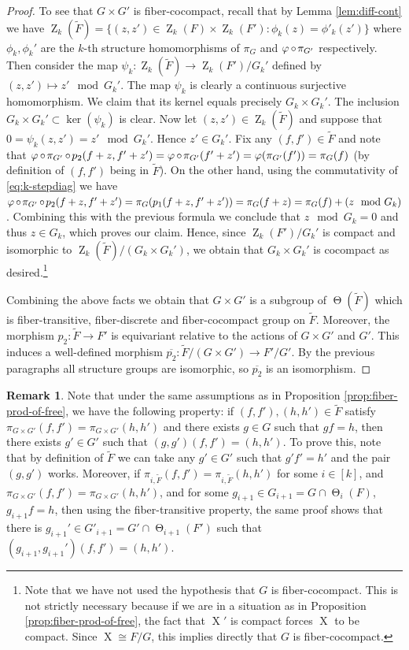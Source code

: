 \documentclass[a4paper,12pt,reqno]{amsart}
\theoremstyle{definition}
\newtheorem{remark}[theorem]{Remark}
\def\to{\rightarrow}
\DeclareMathOperator{\ab}{Z}
\DeclareMathOperator{\tran}{\Theta}
\DeclareMathOperator{\ns}{X}
\DeclareMathOperator{\co}{\circ\hspace{-0.02 cm}}
\begin{document}
\begin{proof}
To see that $G\times G'$ is fiber-cocompact, recall that by Lemma \ref{lem:diff-cont} we have $\ab_k(\tilde{F})=\{(z,z')\in \ab_k(F)\times \ab_k(F'):\phi_k(z)=\phi'_k(z')\}$ where $\phi_k,\phi_k'$ are the $k$-th structure homomorphisms of $\pi_G$ and $\varphi\co \pi_{G'}$ respectively. Then consider the map $\psi_k:\ab_k(\tilde{F})\to \ab_k(F')/G_k'$ defined by $(z,z')\mapsto z'\mod G_k'$. The map $\psi_k$ is clearly a continuous surjective homomorphism. We claim that its kernel equals precisely $G_k\times G_k'$. The inclusion $G_k\times G_k'\subset \ker(\psi_k)$ is clear. Now let $(z,z')\in \ab_k(\tilde{F})$ and suppose that $0=\psi_k(z,z')=z'\mod G_k'$. Hence $z'\in G_k'$. Fix any $(f,f')\in \tilde{F}$ and note that $\varphi\co \pi_{G'}\co p_2(f+z,f'+z') = \varphi\co \pi_{G'}(f'+z') = \varphi(\pi_{G'}(f')) = \pi_G(f)$ (by definition of $(f,f')$ being in $\tilde{F}$). On the other hand, using the commutativity of \eqref{eq:k-stepdiag} we have  $\varphi\co \pi_{G'}\co p_2(f+z,f'+z') = \pi_G(p_1(f+z,f'+z')) = \pi_G(f+z) = \pi_G(f)+(z\mod G_k)$. Combining this with the previous formula we conclude that $z\mod G_k=0$ and thus $z\in G_k$, which proves our claim. Hence, since $\ab_k(F')/G_k'$ is compact and isomorphic to $\ab_k(\tilde F)/(G_k\times G_k')$, we obtain that  $G_k\times G_k'$ is cocompact as desired.\footnote{Note that we have not used the hypothesis that $G$ is fiber-cocompact. This is not strictly necessary because if we are in a situation as in Proposition \ref{prop:fiber-prod-of-free}, the fact that $\ns'$ is compact forces $\ns$ to be compact. Since $\ns\cong F/G$, this implies directly that $G$ is fiber-cocompact.}

Combining the above facts we obtain that $G\times G'$ is a subgroup of $\tran(\tilde{F})$ which is  fiber-transitive, fiber-discrete and fiber-cocompact group on $\tilde{F}$. Moreover, the morphism $p_2:\tilde{F}\to F'$ is equivariant relative to the actions of $G\times G'$ and $G'$. This induces a well-defined morphism $\overline{p_2}:\tilde{F}/(G\times G')\to F'/G'$. By the previous paragraphs all structure groups are isomorphic, so $\overline{p_2}$ is an isomorphism.
\end{proof}

\begin{remark}\label{rem:lifting-of-consistent-trans} Note that under the same assumptions as in Proposition \ref{prop:fiber-prod-of-free}, we have the following property: if $(f,f'),(h,h')\in \tilde{F}$ satisfy $\pi_{G\times G'}(f,f')= \pi_{G\times G'}(h,h')$ and there exists $g\in G$ such that $gf=h$, then there exists $g'\in G'$ such that $(g,g')(f,f')=(h,h')$. To prove this, note that by definition of $\tilde{F}$ we can take any $g'\in G'$ such that $g'f'=h'$ and the pair $(g,g')$ works. Moreover, if $\pi_{i,\tilde{F}}(f,f')=\pi_{i,\tilde{F}}(h,h')$ for some $i\in[k]$, and $\pi_{G\times G'}(f,f')= \pi_{G\times G'}(h,h')$, and  for some $g_{i+1}\in G_{i+1}=G\cap \tran_i(F)$, $g_{i+1}f=h$, then using the fiber-transitive property, the same proof shows that there is $g_{i+1}'\in G'_{i+1}=G'\cap \tran_{i+1}(F')$ such that $(g_{i+1},g_{i+1}')(f,f')=(h,h')$. 
\end{remark}
\end{document}
